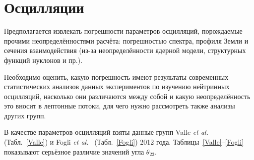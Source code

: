 \part{Осцилляции}
{\color{brown}Предполагается извлекать погрешности параметров осцилляций, порождаемые прочими неопределённостями расчёта: погрешностью спектра, профиля Земли и сечения взаимодействия (из-за неопределённости ядерной модели, структурных функций нуклонов и пр.).}

{\color{MYgreen}Необходимо оценить, какую погрешность имеют результаты современных статистических анализов данных экспериментов по изучению нейтринных осцилляций, насколько они различаются между собой и какую неопределённость это вносит в лептонные потоки, для чего нужно рассмотреть также анализы {\color{red}других} групп.}

В качестве параметров осцилляций взяты данные групп Valle \emph{et al.}~\cite{Tortola:2012te} (Табл.~\ref{Valle}) и Fogli \emph{et al.}~\cite{Fogli:2012ua} (Табл.~\ref{Fogli}) 2012 года. Таблицы~\ref{Valle}--\ref{Fogli} показывают серьёзное различие значений угла $\theta_{23}$.

